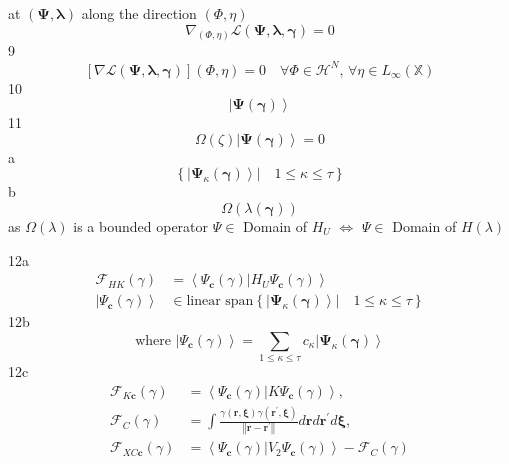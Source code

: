 \documentclass[aps,preprint]{revtex4}%
\begin{document}
at $\left(  \mathbf{\Psi,\lambda}\right)  $ along the direction $\left(
\Phi,\eta\right)  $
\[
\nabla_{\left(  \Phi,\eta\right)  }\mathcal{L}\left(  \mathbf{\Psi
,\lambda,\gamma}\right)  =0
\]
9%
\[
\left[  \nabla\mathcal{L}\left(  \mathbf{\Psi,\lambda,\gamma}\right)  \right]
\left(  \Phi,\eta\right)  =0\quad\forall\Phi\in\mathcal{H}^{N},\,\forall
\eta\in L_{\infty}\left(  \mathbb{X}\right)
\]
10%
\[
\left\vert \mathbf{\Psi}\left(  \mathbf{\gamma}\right)  \right\rangle
\]
11%
\[
\Omega\left(  \zeta\right)  \left\vert \mathbf{\Psi}\left(  \mathbf{\gamma
}\right)  \right\rangle =0
\]
a%
\[
\left\{  \left.  \left\vert \mathbf{\Psi}_{\kappa}\left(  \mathbf{\gamma
}\right)  \right\rangle \right\vert \quad1\leq\kappa\leq\tau\right\}
\]
b%
\[
\Omega\left(  \lambda\left(  \mathbf{\gamma}\right)  \right)
\]
as $\Omega\left(  \lambda\right)  $ is a bounded operator $\Psi\in$ Domain of
$H_{U}$ $\Leftrightarrow$ $\Psi\in$ Domain of $H\left(  \lambda\right)  $

12a%
\begin{align*}
\mathcal{F}_{HK}\left(  \gamma\right)   &  =\left\langle \Psi_{\mathbf{c}%
}\left(  \gamma\right)  \left\vert H_{U}\right.  \Psi_{\mathbf{c}}\left(
\gamma\right)  \right\rangle \\
\left\vert \Psi_{\mathbf{c}}\left(  \gamma\right)  \right\rangle  &
\in\text{linear span}\left\{  \left.  \left\vert \mathbf{\Psi}_{\kappa}\left(
\mathbf{\gamma}\right)  \right\rangle \right\vert \quad1\leq\kappa\leq
\tau\right\}
\end{align*}
12b%
\[
\text{where }\left\vert \Psi_{\mathbf{c}}\left(  \gamma\right)  \right\rangle
=\sum_{1\leq\kappa\leq\tau}c_{\kappa}\left\vert \mathbf{\Psi}_{\kappa}\left(
\mathbf{\gamma}\right)  \right\rangle
\]
12c%
\begin{align*}
\mathcal{F}_{K\mathbf{c}}\left(  \gamma\right)   &  =\left\langle
\Psi_{\mathbf{c}}\left(  \gamma\right)  \left\vert K\right.  \Psi_{\mathbf{c}%
}\left(  \gamma\right)  \right\rangle ,\\
\mathcal{F}_{C}\left(  \gamma\right)   &  =\int\frac{\gamma\left(
\mathbf{r,\xi}\right)  \gamma\left(  \mathbf{r}^{\prime}\mathbf{,\xi}\right)
}{\left\Vert \mathbf{r-r}^{\prime}\right\Vert }d\mathbf{r}d\mathbf{r}^{\prime
}d\mathbf{\xi},\\
\mathcal{F}_{XC\mathbf{c}}\left(  \gamma\right)   &  =\left\langle
\Psi_{\mathbf{c}}\left(  \gamma\right)  \left\vert V_{2}\right.
\Psi_{\mathbf{c}}\left(  \gamma\right)  \right\rangle -\mathcal{F}_{C}\left(
\gamma\right)
\end{align*}
%
\end{document}
